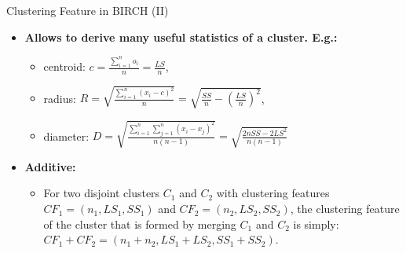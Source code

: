 \begin{frame}{Clustering Feature in BIRCH (II)}
	\begin{itemize}
		\item \textbf{Allows to derive many useful statistics of a cluster. E.g.:}
		      \begin{itemize}
			      \item centroid: $c = \frac{\sum_{i=1}^{n}o_i}{n} = \frac{LS}{n}$,
			      \item radius: $R = \sqrt{\frac{\sum_{i=1}^{n}(x_i-c)^2}{n}} = \sqrt{\frac{SS}{n}-(\frac{LS}{n})^2}$,
			      \item diameter: $D = \sqrt{\frac{\sum_{i=1}^{n}\sum_{j=1}^{n}(x_i-x_j)^2}{n(n-1)}} = \sqrt{\frac{2nSS-2LS^2}{n(n-1)}}$
		      \end{itemize}
		\item \textbf{Additive:}
		      \begin{itemize}
			      \item For two disjoint clusters $C_1$ and $C_2$ with clustering
			            features $CF_1 = (n_1, LS_1, SS_1)$ and $CF_2 = (n_2, LS_2, SS_2)$,
			            the clustering feature of the cluster that is formed by merging
			            $C_1$ and $C_2$ is simply: $CF_1 + CF_2 = (n_1 + n_2, LS_1 + LS_2, SS_1 + SS_2)$.
		      \end{itemize}
	\end{itemize}
\end{frame}

